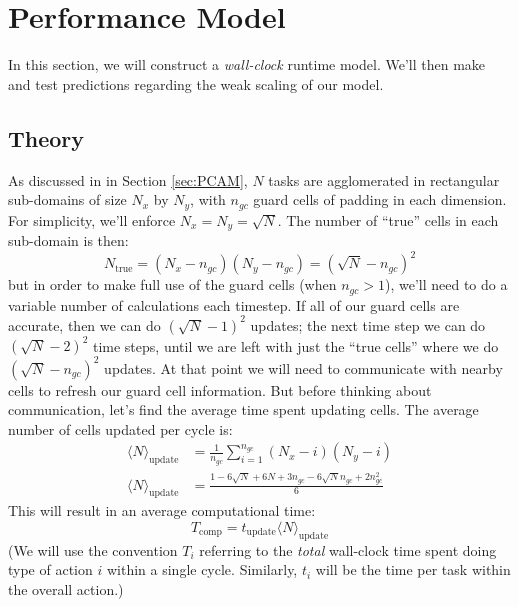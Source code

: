 \documentclass[iop, apj]{emulateapj}
\begin{document}
\section{Performance Model}
\label{sec:model}

In this section, we will construct a \emph{wall-clock} runtime model.  We'll then make and test predictions regarding the weak scaling of our model.

\subsection{Theory}

As discussed in in Section \ref{sec:PCAM}, $N$ tasks are agglomerated in rectangular sub-domains of size $N_x$ by $N_y$, with $n_{gc}$ guard cells of padding in each dimension. For simplicity, we'll enforce $N_x = N_y = \sqrt{N}$.  The number of ``true'' cells in each sub-domain is then:
\begin{equation}
N_\mathrm{true} = (N_x - n_{gc}) (N_y - n_{gc} ) = ( \sqrt{N} - n_{gc})^2
\end{equation}
but in order to make full use of the guard cells (when $n_{gc} > 1$), we'll need to do a variable number of calculations each timestep.  If all of our guard cells are accurate, then we can do $( \sqrt{N} - 1)^2$ updates; the next time step we can do $( \sqrt{N} -2)^2$ time steps, until we are left with just the ``true cells'' where we do $( \sqrt{N} - n_{gc})^2$ updates.  At that point we will need to communicate with nearby cells to refresh our guard cell information.  But before thinking about communication, let's find the average time spent updating cells.  The average number of cells updated per cycle is:
\begin{align}
	\langle N \rangle_\mathrm{update} &= \frac{1}{n_{gc}} \sum\limits_{i=1}^{n_{gc}} (N_x -i)(N_y - i)
	\\
	\langle N \rangle_\mathrm{update} &= \frac{1 - 6 \sqrt{N} + 6 N + 3 n_{gc} - 6 \sqrt{N} n_{gc} + 2 n_{gc}^2}{6}
\end{align}
This will result in an average computational time:
\begin{equation}
	T_\mathrm{comp} = t_\mathrm{update} \langle N \rangle_\mathrm{update}
\end{equation}
(We will use the convention $T_i$ referring to the \emph{total} wall-clock time spent doing type of action $i$ within a single cycle. Similarly, $t_i$ will be the time per task within the overall action.)
\end{document}
